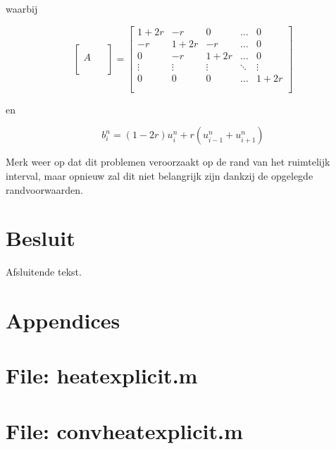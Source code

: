 \documentclass[a4paper,kulak]{kulakarticle} %
\newcommand{\inputcode}[1]{
	
}
\begin{document}
waarbij

\begin{equation*}
	\begin{bmatrix}
		\qquad \\
		A \\
		\\ 
	\end{bmatrix}
	=
	\begin{bmatrix}
		1+2r	&	-r		&	0		&	\dots	&	0 		\\
		-r		&	1+2r	&	-r		&	\dots	&	0		\\
		0		&	-r		&	1+2r	&	\dots	&	0		\\
		\vdots	&	\vdots	&	\vdots	&	\ddots	&	\vdots	\\
		0		&	0		&	0		&	\dots	&	1+2r	\\
		\\ 
	\end{bmatrix}
\end{equation*}

en

\begin{equation*}
	b_i^n = (1-2r)u_i^n + r(u_{i-1}^n + u_{i+1}^n)
\end{equation*}

Merk weer op dat dit problemen veroorzaakt op de rand van het ruimtelijk interval, maar opnieuw zal dit niet belangrijk zijn dankzij de opgelegde randvoorwaarden.

\section*{Besluit}

Afsluitende tekst.

\section*{Appendices}

\appendix

\section{File: heat\textunderscore explicit.m}
	\label{code:heat_explicit}
	\inputcode{heat_explicit}
	
\section{File: convheat\textunderscore explicit.m}
	\label{code:convheat_explicit}
	\inputcode{convheat_explicit}
	
\end{document}
